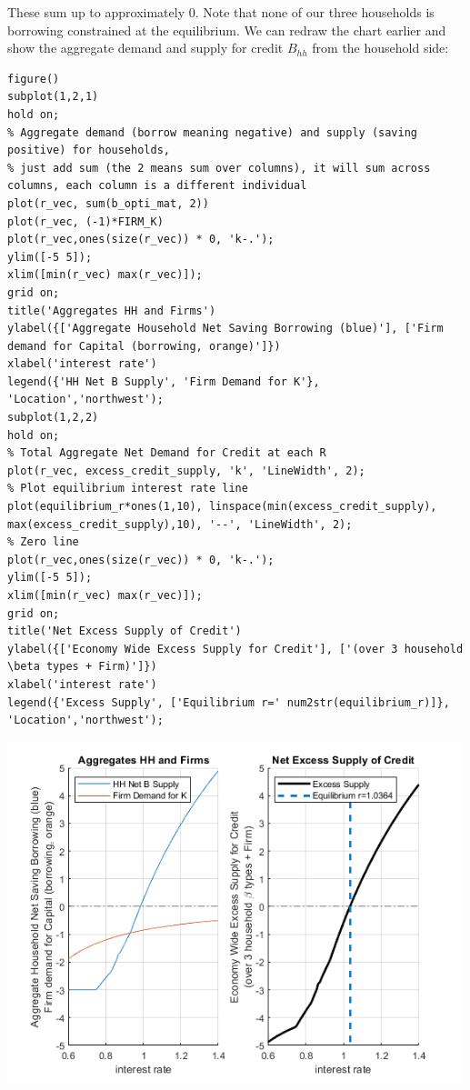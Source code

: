 \documentclass[
]{book}
\begin{document}
These sum up to approximately \(0\). Note that none of our three
households is borrowing constrained at the equilibrium. We can redraw
the chart earlier and show the aggregate demand and supply for credit
\(B_{hh}\) from the household side:

\begin{verbatim}
figure()
subplot(1,2,1)
hold on;
% Aggregate demand (borrow meaning negative) and supply (saving positive) for households, 
% just add sum (the 2 means sum over columns), it will sum across columns, each column is a different individual
plot(r_vec, sum(b_opti_mat, 2))
plot(r_vec, (-1)*FIRM_K)
plot(r_vec,ones(size(r_vec)) * 0, 'k-.');
ylim([-5 5]);
xlim([min(r_vec) max(r_vec)]);
grid on;
title('Aggregates HH and Firms')
ylabel({['Aggregate Household Net Saving Borrowing (blue)'], ['Firm demand for Capital (borrowing, orange)']})
xlabel('interest rate')
legend({'HH Net B Supply', 'Firm Demand for K'}, 'Location','northwest');
subplot(1,2,2)
hold on;
% Total Aggregate Net Demand for Credit at each R
plot(r_vec, excess_credit_supply, 'k', 'LineWidth', 2);
% Plot equilibrium interest rate line
plot(equilibrium_r*ones(1,10), linspace(min(excess_credit_supply), max(excess_credit_supply),10), '--', 'LineWidth', 2);
% Zero line
plot(r_vec,ones(size(r_vec)) * 0, 'k-.');
ylim([-5 5]);
xlim([min(r_vec) max(r_vec)]);
grid on;
title('Net Excess Supply of Credit')
ylabel({['Economy Wide Excess Supply for Credit'], ['(over 3 household \beta types + Firm)']})
xlabel('interest rate')
legend({'Excess Supply', ['Equilibrium r=' num2str(equilibrium_r)]}, 'Location','northwest');
\end{verbatim}

\includegraphics[width=5.20833in,height=\textheight]{img/equilibrium_constrainedborrow_images/figure_3.png}
\end{document}

